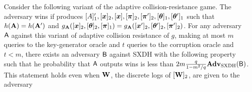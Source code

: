  \begin{lemma} \label{lemma:h-cr-sxdh}
 Consider the following variant of the adaptive collision-resistance game. The adversary wins if produces $\mathbf{{[}}A]'_1,[{\boldsymbol{x}}]_2,[{\boldsymbol{x}}],[{\boldsymbol{\pi}}]_2,[{\boldsymbol{\pi}}']_2,[{\boldsymbol{\theta}}]_1,[{\boldsymbol{\theta}}']_1$ such that $h(\mathbf{{A}})=h(\mathbf{{A}}')$ and $g_{\mathbf{{A}}}([{\boldsymbol{x}}]_2,[{\boldsymbol{\theta}}]_2,[{\boldsymbol{\pi}}]_1)=g_{\mathbf{{A}}}([{\boldsymbol{x}}']_2,[{\boldsymbol{\theta}}']_2,[{\boldsymbol{\pi}}']_2)$.
For any adversary $\mathsf{A}$ against this variant of adaptive collision resistance of $g$, making at most $m$  queries to the key-generator oracle and $t$ queries to the corruption oracle and $t<m$, there exists an adversary $\mathsf{B}$ against SXDH with the following property such that he probability that $\mathsf{A}$ outputs wins is less than $2m\frac{q}{1-m^2/q} \mathbf{Adv}_{\mathrm{SXDH}}(\mathsf{B})$. This statement holds even when $\mathbf{{W}}$, the discrete logs of $[\mathbf{{W}}]_2$, are given to the adversary 
\end{lemma}

